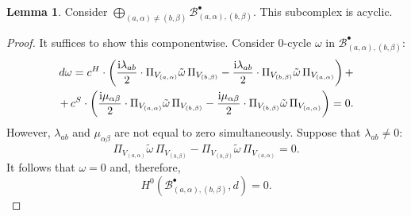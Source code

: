 \documentclass[10pt,a4paper]{amsart}
\theoremstyle{definition}
\newtheorem{lemma}[remark]{Lemma}
\begin{document}
\begin{lemma} \label{lemma:acyclic}
    Consider $\bigoplus_{(a,\alpha)\neq(b,\beta)}\mathcal{B}_{(a,\alpha),(b,\beta)}^\bullet$. This subcomplex is acyclic.
    \begin{proof}
        It suffices to show this componentwise. Consider $0$-cycle $\omega$ in $\mathcal{B}^{\bullet}_{(a,\alpha),(b,\beta)}$:
        \begin{eqnarray}
            \notag d\omega=c^{H}\cdot \left(\frac{\mathrm{i}\lambda_{ab}}{2}\cdot \Pi_{V_{(a,\alpha)}}\tilde{\omega}\,\Pi_{V_{(b,\beta)}}-\frac{\mathrm{i}\lambda_{ab}}{2}\cdot \Pi_{V_{(b,\beta)}}\tilde{\omega}\,\Pi_{V_{(a,\alpha)}}\right)+\\+\,c^{S}\cdot \left(\frac{\mathrm{i}\mu_{\alpha\beta}}{2}\cdot \Pi_{V_{(a,\alpha)}}\tilde{\omega}\,\Pi_{V_{(b,\beta)}}-\frac{\mathrm{i}\mu_{\alpha\beta}}{2}\cdot \Pi_{V_{(b,\beta)}}\tilde{\omega}\,\Pi_{V_{(a,\alpha)}}\right)=0.
        \end{eqnarray}
        However, $\lambda_{ab}$ and $\mu_{\alpha\beta}$ are not equal to zero simultaneously. Suppose that $\lambda_{ab}\neq 0$:
        \begin{equation}
            \Pi_{V_{(a,\alpha)}}\tilde{\omega}\,\Pi_{V_{(b,\beta)}}- \Pi_{V_{(b,\beta)}}\tilde{\omega}\,\Pi_{V_{(a,\alpha)}}=0.
        \end{equation}
        It follows that $\omega=0$ and, therefore,
        \begin{equation}
        H^{0}(\mathcal{B}^{\bullet}_{(a,\alpha),(b,\beta)},d)=0.
        \end{equation}


\end{proof}
\end{lemma}
\end{document}

